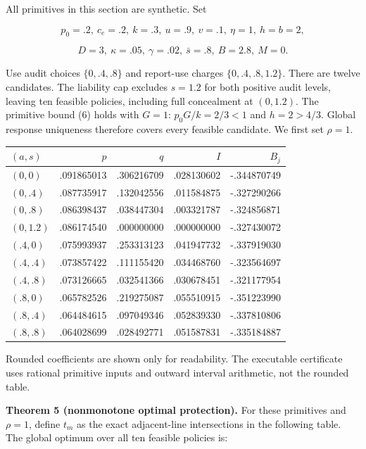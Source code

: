 \documentclass[
  11pt,
]{article}
\begin{document}
All primitives in this section are synthetic. Set

\[p_0=.2,\ c_e=.2,\ k=.3,\ u=.9,\ v=.1,\ \eta=1,\ h=b=2,\]

\[D=3,\ \kappa=.05,\ \gamma=.02,\ \bar s=.8,\ B=2.8,\ M=0.\]

Use audit choices \(\{0,.4,.8\}\) and report-use charges
\(\{0,.4,.8,1.2\}\). There are twelve candidates. The liability cap
excludes \(s=1.2\) for both positive audit levels, leaving ten feasible
policies, including full concealment at \((0,1.2)\). The primitive bound
(6) holds with \(G=1\): \(p_0G/k=2/3<1\) and \(h=2>4/3\). Global
response uniqueness therefore covers every feasible candidate. We first
set \(\rho=1\).

\begin{longtable}[]{@{}lrrrr@{}}
\toprule\noalign{}
\((a,s)\) & \(p\) & \(q\) & \(I\) & \(B_j\) \\
\midrule\noalign{}
\endhead
\bottomrule\noalign{}
\endlastfoot
\((0,0)\) & .091865013 & .306216709 & .028130602 & -.344870749 \\
\((0,.4)\) & .087735917 & .132042556 & .011584875 & -.327290266 \\
\((0,.8)\) & .086398437 & .038447304 & .003321787 & -.324856871 \\
\((0,1.2)\) & .086174540 & .000000000 & .000000000 & -.327430072 \\
\((.4,0)\) & .075993937 & .253313123 & .041947732 & -.337919030 \\
\((.4,.4)\) & .073857422 & .111155420 & .034468760 & -.323564697 \\
\((.4,.8)\) & .073126665 & .032541366 & .030678451 & -.321177954 \\
\((.8,0)\) & .065782526 & .219275087 & .055510915 & -.351223990 \\
\((.8,.4)\) & .064484615 & .097049346 & .052839330 & -.337810806 \\
\((.8,.8)\) & .064028699 & .028492771 & .051587831 & -.335184887 \\
\end{longtable}

Rounded coefficients are shown only for readability. The executable
certificate uses rational primitive inputs and outward interval
arithmetic, not the rounded table.

\textbf{Theorem 5 (nonmonotone optimal protection).} For these
primitives and \(\rho=1\), define \(t_m\) as the exact adjacent-line
intersections in the following table. The global optimum over all ten
feasible policies is:
\end{document}
